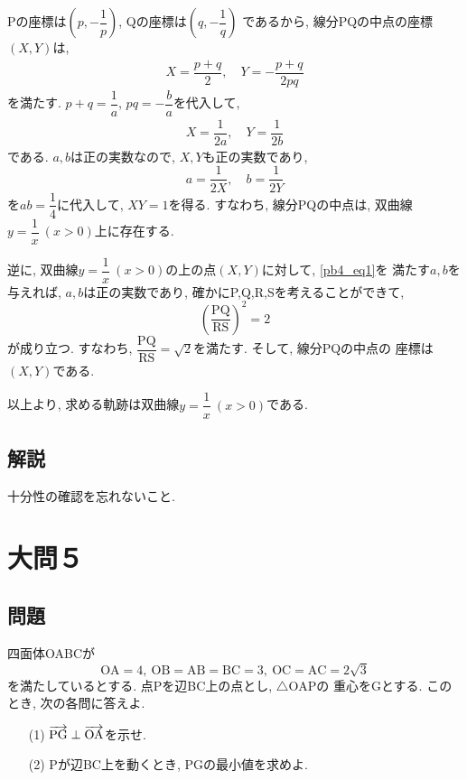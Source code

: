 \documentclass[dvipdfmx,a4paper]{jsarticle}
\begin{document}
    Pの座標は$\left(p, -\dfrac{1}{p}\right)$, Qの座標は$\left(q, -\dfrac{1}{q} \right)$
    であるから, 線分PQの中点の座標$(X,Y)$は, 
    \begin{align*}
        X = \dfrac{p+q}{2}, \quad Y = -\dfrac{p+q}{2pq}
    \end{align*}
    を満たす. $p + q = \dfrac{1}{a}$, $pq = -\dfrac{b}{a}$を代入して, 
    \begin{align*}
        X = \dfrac{1}{2a}, \quad Y = \dfrac{1}{2b}
    \end{align*}
    である. $a,b$は正の実数なので, $X,Y$も正の実数であり, 
    \begin{equation} \label{pb4_eq1}
        a = \dfrac{1}{2X}, \quad b = \dfrac{1}{2Y}
    \end{equation}
    を$ab=\dfrac{1}{4}$に代入して, $XY=1$を得る. すなわち, 線分PQの中点は, 
    双曲線$y=\dfrac{1}{x} \ (x>0)$上に存在する. 

    逆に, 双曲線$y=\dfrac{1}{x} \ (x>0)$の上の点$(X,Y)$に対して, \eqref{pb4_eq1}を
    満たす$a,b$を与えれば, $a,b$は正の実数であり, 確かにP,Q,R,Sを考えることができて, 
    \begin{equation*}
        \left(\dfrac{\mathrm{PQ}}{\mathrm{RS}} \right)^2 = 2
    \end{equation*}
    が成り立つ. すなわち, $\mathrm{\dfrac{PQ}{RS} = \sqrt{2}}$を満たす. そして, 線分PQの中点の
    座標は$(X,Y)$である. 

    以上より, 求める軌跡は双曲線$y=\dfrac{1}{x} \ (x>0)$である. 

    \subsection{解説}
    十分性の確認を忘れないこと. 

    \section{大問５}
    \subsection{問題}
    四面体OABCが
    \begin{equation*}
        \mathrm{
            OA = 4,\ OB=AB=BC=3,\ OC=AC=2\sqrt{3}
        }
    \end{equation*}
    を満たしているとする. 点Pを辺BC上の点とし, $\triangle \mathrm{OAP}$の
    重心をGとする. このとき, 次の各問に答えよ. 
    \begin{itemize}
        \item [(1)] $\overrightarrow{\mathrm{PG}} \perp \overrightarrow{\mathrm{OA}}$を示せ. 
        \item [(2)] Pが辺BC上を動くとき, PGの最小値を求めよ. 
    \end{itemize}
\end{document}
